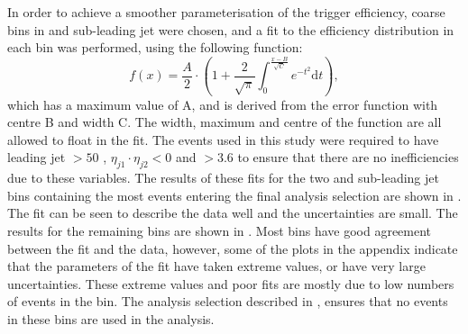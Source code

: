 In order to achieve a smoother parameterisation of the trigger efficiency, coarse bins in \Mjj and sub-leading jet \pt were chosen, and a fit to the \METnoMU efficiency distribution in each bin was performed, using the following function:
\begin{equation}
  \label{eq:parkedtrigfunc}
  f\left(x\right)=\frac{A}{2}\cdot\left(1+ \frac{2}{\sqrt{\pi}}\int_{0}^{\frac{x-B}{\sqrt{C}}}e^{-t^{2}}\mathrm{d}t\right),
\end{equation}
which has a maximum value of A, and is derived from the error function with centre B and width C. The width, maximum and centre of the function are all allowed to float in the fit. The events used in this study were required to have leading jet \pt$>50$ \GeV, $\eta_{j1}\cdot\eta_{j2}<0$ and \detajj$>3.6$ to ensure that there are no inefficiencies due to these variables. The results of these fits for the two \Mjj and sub-leading jet \pt bins containing the most events entering the final analysis selection are shown in . The fit can be seen to describe the data well and the uncertainties are small. The results for the remaining bins are shown in . Most bins have good agreement between the fit and the data, however, some of the plots in the appendix indicate that the parameters of the fit have taken extreme values, or have very large uncertainties. These extreme values and poor fits are mostly due to low numbers of events in the bin. The analysis selection described in , ensures that no events in these bins are used in the analysis.


